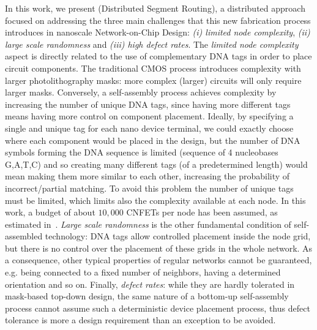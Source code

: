 In this work, we present \disr{} (Distributed Segment Routing), a distributed
approach focused on addressing the three main challenges that this new fabrication process introduces
in nanoscale Network-on-Chip Design: \emph{(i) limited node complexity}, \emph{(ii) large scale
randomness} and \emph{(iii) high defect rates}.  
The \emph{limited node complexity} aspect is directly
related to the use of complementary DNA tags in order to place circuit
components. The traditional CMOS process introduces complexity 
with larger photolithography masks: more complex (larger) circuits
will only require larger masks. Conversely, a self-assembly process achieves
complexity by increasing the number of unique DNA tags, since having more
different tags means having more control on component placement. Ideally, by specifying a single
and unique tag for each nano device terminal, we could exactly
choose where each component would be placed in the design, but the number of DNA
symbols forming the DNA sequence is limited (sequence of 4 nucleobases
G,A,T,C) and so creating many different tags (of a predetermined length) would
mean making them more similar to each other, increasing the probability
of incorrect/partial matching. To avoid this problem 
the number of unique tags must be limited, which limits also the
complexity available at each node.
In this work, a budget of about $10,000$ CNFETs per node
has been assumed, as estimated in~\cite{liu_jetcs}.
\emph{Large scale randomness} is the other fundamental condition of
self-assembled technology: DNA tags allow controlled placement inside the
node grid, but there is no control over the placement of these grids
in the whole network. As a consequence, other typical
properties of regular networks cannot be guaranteed, e.g. being
connected to a fixed number of neighbors, having a determined
orientation and so on.
Finally, \emph{defect rates}: while they are hardly tolerated in 
mask-based top-down design, the same nature of a bottom-up self-assembly
 process cannot assume such a deterministic device placement
process, thus defect tolerance is more a design requirement
than an exception to be avoided.

